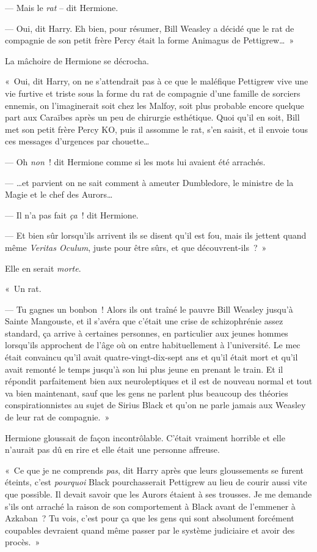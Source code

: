 --- Mais le \emph{rat} -- dit Hermione.

--- Oui, dit Harry.
Eh bien, pour résumer, Bill Weasley a décidé que le rat de compagnie de son petit frère Percy était la forme Animagus de Pettigrew…~»

La mâchoire de Hermione se décrocha.

«~Oui, dit Harry, on ne s'attendrait pas à ce que le maléfique Pettigrew vive une vie furtive et triste sous la forme du rat de compagnie d'une famille de sorciers ennemis, on l'imaginerait soit chez les Malfoy, soit plus probable encore quelque part aux Caraïbes après un peu de chirurgie esthétique.
Quoi qu'il en soit, Bill met son petit frère Percy KO, puis il assomme le rat, s'en saisit, et il envoie tous ces messages d'urgences par chouette…

--- Oh \emph{non}~! dit Hermione comme si les mots lui avaient été arrachés.

--- …et parvient on ne sait comment à ameuter Dumbledore, le ministre de la Magie et le chef des Aurors…

--- Il n'a pas fait \emph{ça}~! dit Hermione.

--- Et bien sûr lorsqu'ils arrivent ils se disent qu'il est fou, mais ils jettent quand même \emph{Veritas Oculum}, juste pour être sûrs, et que découvrent-ils~?~»

Elle en serait \emph{morte}.

«~Un rat.

--- Tu gagnes un bonbon~!
Alors ils ont traîné le pauvre Bill Weasley jusqu'à Sainte Mangouste, et il s'avéra que c'était une crise de schizophrénie assez standard, ça arrive à certaines personnes, en particulier aux jeunes hommes lorsqu'ils approchent de l'âge où on entre habituellement à l'université.
Le mec était convaincu qu'il avait quatre-vingt-dix-sept ans et qu'il était mort et qu'il avait remonté le temps jusqu'à son lui plus jeune en prenant le train.
Et il répondit parfaitement bien aux neuroleptiques et il est de nouveau normal et tout va bien maintenant, sauf que les gens ne parlent plus beaucoup des théories conspirationnistes au sujet de Sirius Black et qu'on ne parle jamais aux Weasley de leur rat de compagnie.~»

Hermione gloussait de façon incontrôlable.
C'était vraiment horrible et elle n'aurait pas dû en rire et elle était une personne affreuse.

«~Ce que je ne comprends \emph{pas}, dit Harry après que leurs gloussements se furent éteints, c'est \emph{pourquoi} Black pourchasserait Pettigrew au lieu de courir aussi vite que possible.
Il devait savoir que les Aurors étaient à ses trousses.
Je me demande s'ils ont arraché la raison de son comportement à Black avant de l'emmener à Azkaban~?
Tu vois, c'est pour ça que les gens qui sont absolument forcément coupables devraient quand même passer par le système judiciaire et avoir des procès.~»

